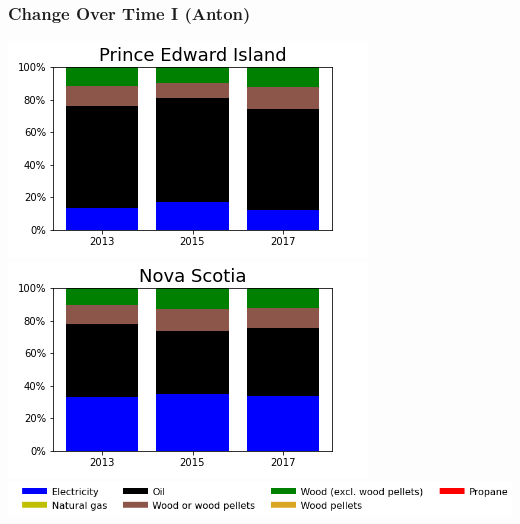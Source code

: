 \documentclass{beamer}
\begin{document}
\begin{frame}
\frametitle{Change Over Time I (Anton)}
\begin{center}
\includegraphics[width=0.5\linewidth]{pe.png}%
\includegraphics[width=0.5\linewidth]{ns.png}\\
\includegraphics[width=0.9\linewidth]{leg_bar.png}
\end{center}
\end{frame}
\end{document}
